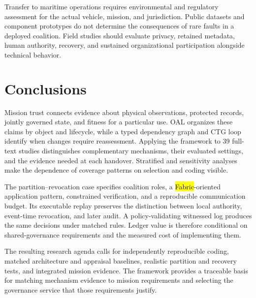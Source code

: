 \documentclass[blockchains,review,accept,moreauthors]{Definitions/mdpi}
\begin{document}
Transfer to maritime operations requires environmental and regulatory assessment for the actual vehicle, mission, and jurisdiction. Public datasets and component prototypes do not determine the consequences of rare faults in a deployed coalition. Field studies should evaluate privacy, retained metadata, human authority, recovery, and sustained organizational participation alongside technical behavior.



\section{Conclusions}

Mission trust connects evidence about physical observations, protected records, jointly governed state, and fitness for a particular use. OAL organizes these claims by object and lifecycle, while a typed dependency graph and CTG loop identify when changes require reassessment. Applying the framework to 39 full-text studies distinguishes complementary mechanisms, their evaluated settings, and the evidence needed at each handover. Stratified and sensitivity analyses make the dependence of coverage patterns on selection and coding visible.

The partition--revocation case specifies coalition roles, a \hl{Fabric}-oriented application pattern, constrained verification, and a reproducible communication budget. Its executable replay preserves the distinction between local authority, event-time revocation, and later audit. A policy-validating witnessed log produces the same decisions under matched rules. Ledger value is therefore conditional on shared-governance requirements and the measured cost of implementing them.

The resulting research agenda calls for independently reproducible coding, matched architecture and appraisal baselines, realistic partition and recovery tests, and integrated mission evidence. The framework provides a traceable basis for matching mechanism evidence to mission requirements and selecting the governance service that those requirements justify.
\end{document}
